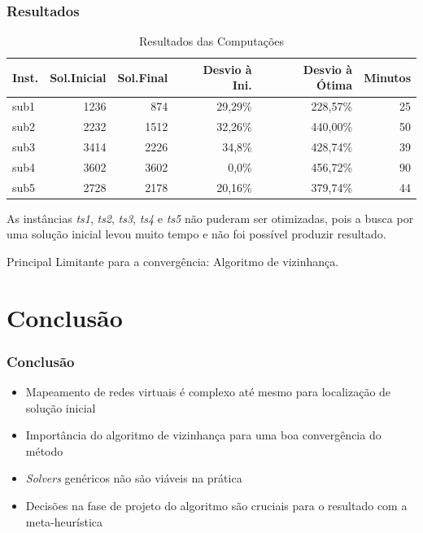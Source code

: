 \documentclass{beamer}
\begin{document}
\begin{frame}
\frametitle{Resultados}

\footnotesize{
\begin{table}[H]
\centering
\begin{tabular}{|l | r | r | r | r | r|}
	\hline
	\textbf{Inst.} & \textbf{Sol.Inicial} & \textbf{Sol.Final} & \textbf{Desvio à Ini.} & \textbf{Desvio à Ótima} & \textbf{Minutos} \\ \hline
	sub1	& 1236	& 874	& 29,29\%	& 228,57\%	& 25	\\ \hline
	sub2	& 2232	& 1512	& 32,26\%	& 440,00\%	& 50	\\ \hline
	sub3	& 3414	& 2226	& 34,8\%	& 428,74\%	& 39	\\ \hline
	sub4	& 3602	& 3602 	& 0,0\%		& 456,72\%	& 90	\\ \hline
	sub5	& 2728	& 2178	& 20,16\%	& 379,74\%	& 44	\\ \hline
\end{tabular}
\caption{Resultados das Computações}
\label{tab:Resultado}
\end{table}
As instâncias \emph{ts1}, \emph{ts2}, \emph{ts3}, \emph{ts4} e \emph{ts5} não puderam ser otimizadas, pois a busca por uma solução inicial levou muito tempo e não foi possível produzir resultado.

Principal Limitante para a convergência: Algoritmo de vizinhança.
}
\end{frame}


\section{Conclusão}

\begin{frame}
\frametitle{Conclusão}
\begin{itemize}
\item Mapeamento de redes virtuais é complexo até mesmo para localização de solução inicial
\item Importância do algoritmo de vizinhança para uma boa convergência do método
\item \emph{Solvers} genéricos não são viáveis na prática
\item Decisões na fase de projeto do algoritmo são cruciais para o resultado com a meta-heurística
\end{itemize}
\end{frame}
\end{document}
